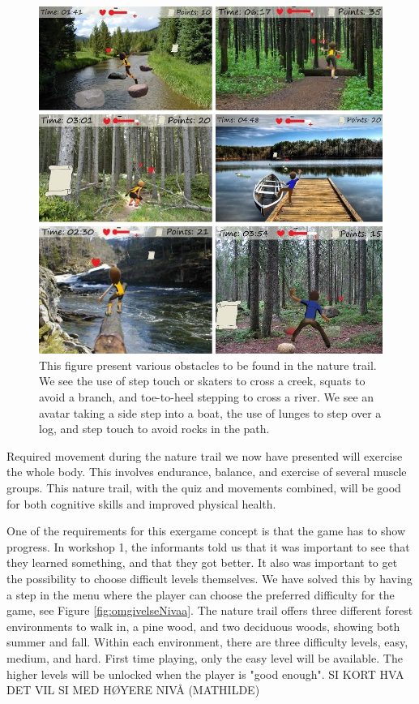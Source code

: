\begin{figure} [H]
\centering
\includegraphics[scale=0.6]{hindringerEng.jpg}
\caption[Nature trail - obstacles]{This figure present various obstacles to be found in the nature trail. We see the use of step touch or skaters to cross a creek, squats to avoid a branch, and toe-to-heel stepping to cross a river. We see an avatar taking a side step into a boat, the use of lunges to step over a log, and step touch to avoid rocks in the path.}
\label{fig:hindring}
\end{figure}

Required movement during the nature trail we now have presented will exercise the whole body. This involves endurance, balance, and exercise of several muscle groups. This nature trail, with the quiz and movements combined, will be good for both cognitive skills and improved physical health.  

One of the requirements for this exergame concept is that the game has to show progress. In workshop 1, the informants told us that it was important to see that they learned something, and that they got better. It also was important to get the possibility to choose difficult levels themselves. We have solved this by having a step in the menu where the player can choose the preferred difficulty for the game, see Figure \ref{fig:omgivelseNivaa}. The nature trail offers three different forest environments to walk in, a pine wood, and two deciduous woods, showing both summer and fall. Within each environment, there are three difficulty levels, easy, medium, and hard. First time playing, only the easy level will be available. The higher levels will be unlocked when the player is "good enough".  SI KORT HVA DET VIL SI MED HØYERE NIVÅ (MATHILDE) 

